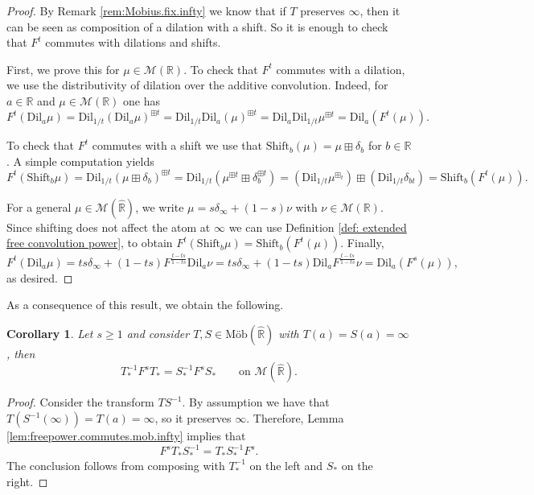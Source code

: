 \documentclass[reqno,11pt]{amsart}
\newtheorem{corollary}[theorem]{Corollary}
\theoremstyle{remark}
\newcommand{\rr}{\mathbb{R}}
\newcommand{\MM}{\mathcal{M}}
\newcommand{\dil}[1]{\mbox{Dil}_{#1}}
\newcommand{\shift}[1]{\mbox{Shift}_{#1}}
\newcommand{\freepower}[1]{F^{#1}}
\newcommand{\mobr}{\text{Möb}(\hat{\rr})}
\begin{document}
\begin{proof}
By Remark \ref{rem:Mobius.fix.infty} we know that if $T$ preserves $\infty$, then it can be seen as composition of a dilation with a shift. So it is enough to check that $\freepower{t}$ commutes with dilations and shifts.

First, we prove this for $\mu\in \MM(\rr)$. To check that $\freepower{t}$ commutes with a dilation, we use the distributivity of dilation over the additive convolution. Indeed, for $a\in\rr$ and $\mu\in\MM(\rr)$ one has
$$\freepower{t}(\dil{a}\mu)=\dil{1/t}(\dil{a}\mu)^{\boxplus t}=\dil{1/t}\dil{a}(\mu)^{\boxplus t}
=\dil{a}\dil{1/t}\mu^{\boxplus t}=\dil{a}(\freepower{t}(\mu)).$$

To check that $\freepower{t}$ commutes with a shift we use that $\shift{b}(\mu)=\mu\boxplus \delta_b$ for $b\in\rr$. A simple computation yields
$$ \freepower{t} (\shift{b}\mu) = \dil{1/t}( \mu\boxplus \delta_b )^{\boxplus t} = \dil{1/t}( \mu^{\boxplus t}\boxplus \delta_{b}^{\boxplus t} )= (\dil{1/t}\mu^{\boxplus_t})\boxplus (\dil{1/t}\delta_{bt}) = \shift{b}(\freepower{t} (\mu)).$$

For a general $ \mu \in \MM(\hat{\rr}) $, we write $\mu = s\delta_\infty + (1-s)\nu$ with $ \nu \in \MM(\rr) $. Since shifting does not affect the atom at $\infty$ we can use Definition \ref{def: extended free convolution power},  to obtain $ \freepower{t} (\shift{b}\mu)=\shift{b}(\freepower{t} (\mu)) $. Finally,
$$ \freepower{t}(\dil{a}\mu) = ts\delta_\infty + (1-ts)\freepower{\frac{t-ts}{1-ts}}\dil{a}\nu = ts\delta_\infty + (1-ts)\dil{a}\freepower{\frac{t-ts}{1-ts}}\nu = \dil{a}(\freepower{s}(\mu)),$$
as desired.
\end{proof}

As a consequence of this result, we obtain the following.

\begin{corollary}
\label{cor:free.power.mob.a.infty}
Let $s\geq 1$ and consider $T,S\in\mobr$ with $T(a)=S(a)=\infty$, then 
$$ T^{-1}_*\freepower{s} T_*= S^{-1}_*\freepower{s} S_* \qquad \text{on }\MM(\hat{\rr}).$$
\end{corollary}

\begin{proof}
Consider the transform $TS^{-1}$. By assumption we have that $T(S^{-1}(\infty))=T(a)=\infty$, so it preserves $\infty$. Therefore, Lemma \ref{lem:freepower.commutes.mob.infty} implies that 
$$ \freepower{s} T_*S^{-1}_*= T_*S^{-1}_*\freepower{s}.$$ 
The conclusion follows from composing with $T^{-1}_*$ on the left and $S_*$ on the right.
\end{proof}
\end{document}
